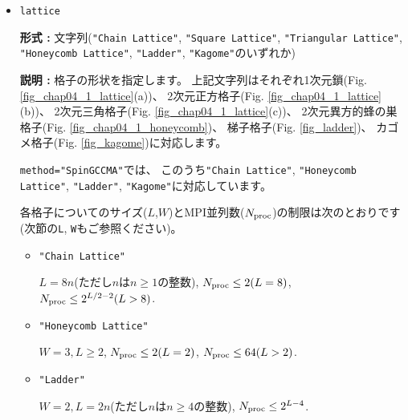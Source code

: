 \begin{itemize}
  {\bf 形式 :} 文字列(\verb|"Lanczos"|, \verb|"TPQ"|, \verb|"Full Diag"|,
  \verb|"CG"|のいずれか)

{\bf 説明 :} 実行する計算の種類を指定します。
上記の文字列はそれぞれランチョス法による少数固有状態の計算, 
熱力学的純粋状態を用いた有限温度計算, 
直接法による全固有状態計算,
LOBCG法\cite{doi:10.1137/S1064827500366124,transactionJSCES2006}による少数固有状態の計算
に対応します。

後述のスペクトル計算において使用される手法もこのパラメーターで指定されます
\verb|"CG"|とした場合には
付属している$K\omega$ライブラリ\cite{komega}が呼び出され、
シードスイッチ付きシフト双共役勾配法
\cite{Frommer2003,doi:10.1143/JPSJ.77.114713}が適用されます。


\item \verb|lattice|

{\bf 形式 :} 文字列(\verb|"Chain Lattice"|, \verb|"Square Lattice"|, 
\verb|"Triangular Lattice"|, \verb|"Honeycomb Lattice"|, \verb|"Ladder"|, \verb|"Kagome"|のいずれか)

{\bf 説明 :} 格子の形状を指定します。
上記文字列はそれぞれ1次元鎖(Fig. \ref{fig_chap04_1_lattice}(a))、
2次元正方格子(Fig. \ref{fig_chap04_1_lattice}(b))、
2次元三角格子(Fig. \ref{fig_chap04_1_lattice}(c))、
2次元異方的蜂の巣格子(Fig. \ref{fig_chap04_1_honeycomb})、
梯子格子(Fig. \ref{fig_ladder})、
カゴメ格子(Fig. \ref{fig_kagome})に対応します。

\verb|method="SpinGCCMA"|では、
このうち\verb|"Chain Lattice"|, \verb|"Honeycomb Lattice"|, 
\verb|"Ladder"|, \verb|"Kagome"|に対応しています。

各格子についてのサイズ($L$,$W$)とMPI並列数($N_{\rm proc}$)の制限は次のとおりです
(次節の\verb|L|, \verb|W|もご参照ください)。

\begin{itemize}

  \item \verb|"Chain Lattice"|

    $L = 8n$(ただし$n$は$n\geq1$の整数),
    $N_{\rm proc} \leq 2(L=8)$, $N_{\rm proc} \leq 2^{L/2-2}(L>8)$.
    
  \item \verb|"Honeycomb Lattice"|

    $W=3, L \geq 2$, $N_{\rm proc} \leq 2(L=2)$, $N_{\rm proc} \leq 64(L>2)$.

  \item \verb|"Ladder"|

    $W=2, L = 2n$(ただし$n$は$n\geq4$の整数),
    $N_{\rm proc} \leq 2^{L-4}$.


\end{itemize}
\end{itemize}
